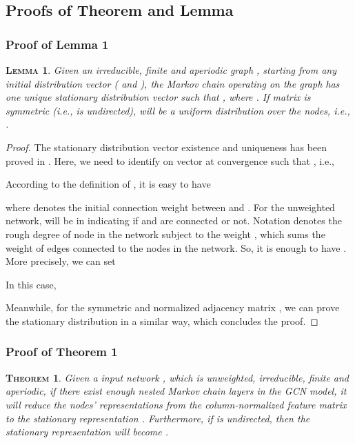 \documentclass{article}
\newtheorem{appendix_theo}{\textsc{Theorem}}
\newtheorem{appendix_lemma}{\textsc{Lemma}}
\newcommand{\gcn}{\textsc{GCN}}
\begin{document}
\newpage

\subsection{Proofs of Theorem and Lemma}

\subsubsection{Proof of Lemma 1}

\begin{appendix_lemma}\label{lemma:appendix_stationary}
Given an \textit{irreducible}, \textit{finite} and \textit{aperiodic} graph , starting from any initial distribution vector  ( and ), the Markov chain operating on the graph has one unique stationary distribution vector  such that , where . If matrix  is symmetric (i.e.,  is undirected),  will be a uniform distribution over the nodes, i.e., .
\end{appendix_lemma}

\begin{proof}
The stationary distribution vector existence and uniqueness has been proved in \cite{N98}. Here, we need to identify on vector  at convergence such that , i.e.,


According to the definition of , it is easy to have

where  denotes the initial connection weight between  and . For the unweighted network,  will be in  indicating if  and  are connected or not. Notation  denotes the rough degree of node  in the network subject to the weight , which sums the weight of edges connected to the nodes in the network. So, it is enough to have . More precisely, we can set 


In this case,


Meanwhile, for the symmetric and normalized adjacency matrix , we can prove the stationary distribution  in a similar way,
which concludes the proof.
\end{proof}

\subsubsection{Proof of Theorem 1}

\begin{appendix_theo}
Given a input network , which is \textit{unweighted}, \textit{irreducible}, \textit{finite} and \textit{aperiodic}, if there exist enough nested Markov chain layers in the {\gcn} model, it will reduce the nodes' representations from the column-normalized feature matrix  to the stationary representation . Furthermore, if  is undirected, then the stationary representation will become .
\end{appendix_theo}
\end{document}
